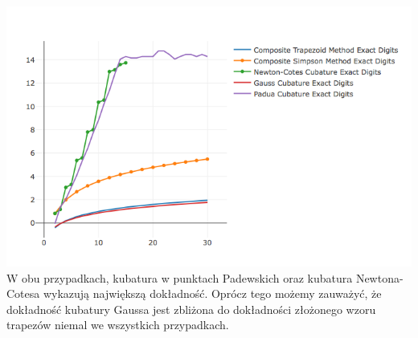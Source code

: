 \documentclass[10pt,wide]{mwart}
\theoremstyle{definition}
\begin{document}
\includegraphics[scale=0.7]{expd.png}
W obu przypadkach, kubatura w punktach Padewskich oraz kubatura Newtona-Cotesa wykazują największą dokładność.
Oprócz tego możemy zauważyć, że dokładność kubatury Gaussa jest zbliżona do dokładności złożonego wzoru trapezów niemal we wszystkich przypadkach.
\end{document}

